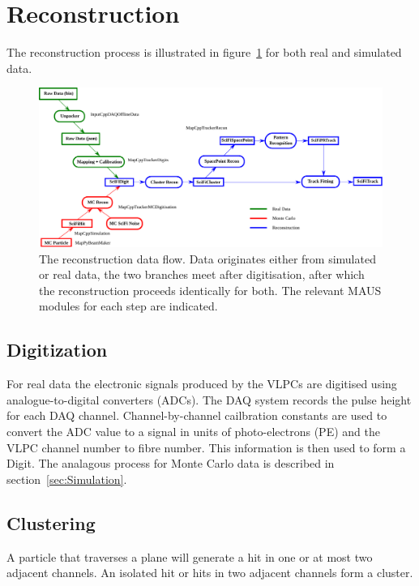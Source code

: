\section{Reconstruction}
\label{sec:Reconstruction}
The reconstruction process is illustrated in figure~\ref{fig:DataFlow} for both real and simulated data.

\begin{figure}[tbh]
  \begin{center}
    \includegraphics[width=0.95\linewidth]{07-Reconstruction/DataFlow2014.pdf}
    \caption{\label{fig:DataFlow} The reconstruction data flow. Data originates either from simulated or real data, the two branches meet after digitisation, after which the reconstruction proceeds identically for both.  The relevant MAUS modules for each step are indicated.}
  \end{center}
\end{figure}

  \subsection{Digitization}
  \label{subsec:Digitization}
  For real data the electronic signals produced by the VLPCs are digitised using analogue-to-digital converters (ADCs). The DAQ system records the pulse height for each DAQ channel.  Channel-by-channel cailbration constants are used to convert the ADC value to a signal in units of photo-electrons (PE) and the VLPC channel number to fibre number.  This information is then used to form a Digit.  The analagous process for Monte Carlo data is described in section~\ref{sec:Simulation}.

  \subsection{Clustering}
  \label{subsec:Clustering}
  A particle that traverses a plane will generate a hit in one or at most two adjacent channels.  An isolated hit or hits in two adjacent channels form a cluster.  
  
